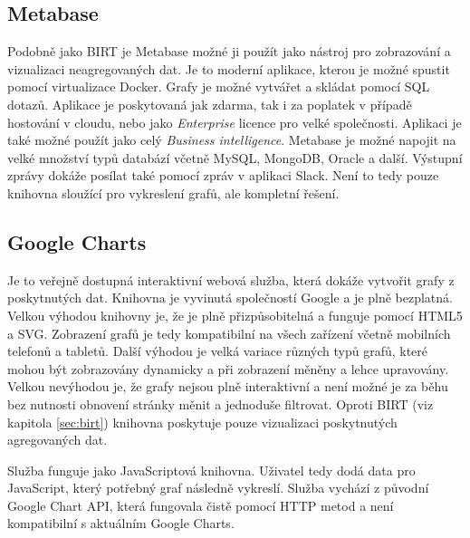 \documentclass[czech,master]{diploma}
\begin{document}
\subsection{Metabase}
Podobně jako BIRT je Metabase možné ji použít jako nástroj pro zobrazování a vizualizaci neagregovaných dat. Je to moderní aplikace, kterou je možné spustit pomocí virtualizace Docker. Grafy je možné vytvářet a skládat pomocí SQL dotazů. Aplikace je poskytovaná jak zdarma, tak i za poplatek v případě hostování v cloudu, nebo jako \textit{Enterprise} licence pro velké společnosti. Aplikaci je také možné použít jako celý \textit{Business intelligence}. Metabase je možné napojit na velké množství typů databází včetně MySQL, MongoDB, Oracle a další. Výstupní zprávy dokáže posílat také pomocí zpráv v aplikaci Slack. Není to tedy pouze knihovna sloužící pro vykreslení grafů, ale kompletní řešení. \cite{ref:metabase}


\subsection{Google Charts}
\label{sec:google_charts}
Je to veřejně dostupná interaktivní webová služba, která dokáže vytvořit grafy z poskytnutých dat. Knihovna je vyvinutá společností Google a je plně bezplatná. Velkou výhodou knihovny je, že je plně přizpůsobitelná a funguje pomocí HTML5 a SVG. Zobrazení grafů je tedy kompatibilní na všech zařízení včetně mobilních telefonů a tabletů. Další výhodou je velká variace různých typů grafů, které mohou být zobrazovány dynamicky a při zobrazení měněny a lehce upravovány. Velkou nevýhodou je, že grafy nejsou plně interaktivní a není možné je za běhu bez nutnosti obnovení stránky měnit a jednoduše filtrovat. Oproti BIRT (viz kapitola \ref{sec:birt}) knihovna poskytuje pouze vizualizaci poskytnutých agregovaných dat.

Služba funguje jako JavaScriptová knihovna. Uživatel tedy dodá data pro JavaScript, který potřebný graf následně vykreslí. Služba vychází z původní Google Chart API, která fungovala čistě pomocí HTTP metod a není kompatibilní s aktuálním Google Charts. \cite{ref:google_charts}
\end{document}
